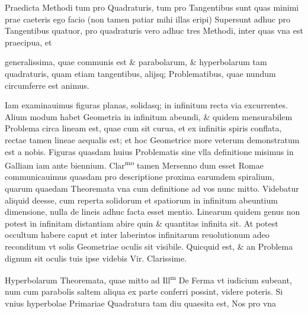 \documentclass[11pt,a4paper]{article}
\begin{document}
Praedicta Methodi tum pro Quadraturis, tum pro Tangentibus sunt quas minimi prae caeteris ego facio (non tamen patiar mihi illas eripi) Supersunt adhuc pro Tangentibus quatuor, pro quadraturis vero adhuc tres Methodi, inter quas vna est praecipua, et


generalissima, quae communis est \& parabolarum, \& hyperbolarum tam quadraturis, quam etiam tangentibus, alijsq; Problematibus, quae nundum circumferre est animus.

Iam examinauimus figuras planas, solidasq; in infinitum recta via excurrentes. Alium modum habet Geometria in infinitum abeundi, \& quidem mensurabilem Problema circa lineam est, quae cum sit curua, et ex infinitis spiris conflata, rectae tamen lineae aequalis est; et hoc Geometrice more veterum demonstratum est a nobis. Figuras quasdam huius Problematis sine vlla definitione misimus in Galliam iam ante biennium. Clar\textsuperscript{mo} tamen Mersenno dum esset Romae communicauimus quasdam  pro descriptione proxima earumdem spiralium, quarum quaedam Theoremata vna cum definitione ad vos nunc mitto. Videbatur aliquid deesse, cum reperta solidorum et spatiorum in infinitum abeuntium dimensione, nulla de lineis adhuc facta esset mentio. Linearum quidem genus non potest in infinitam distantiam abire quin \& quantitas infinita sit. At potest occultum habere caput et inter laberintos infinitarum reuolutionum adeo reconditum vt solis Geometriae oculis sit visibile. Quicquid est, \& an Problema dignum sit oculis tuis ipse videbis Vir. Clarissime.

Hyperbolarum Theoremata, quae mitto ad Ill\textsuperscript{m} De Ferma vt iudicium subeant, num cum parabolis saltem aliqua ex parte conferri possint, videre poteris. Si vnius hyperbolae Primariae Quadratura tam diu quaesita est, Nos pro vna
\end{document}
